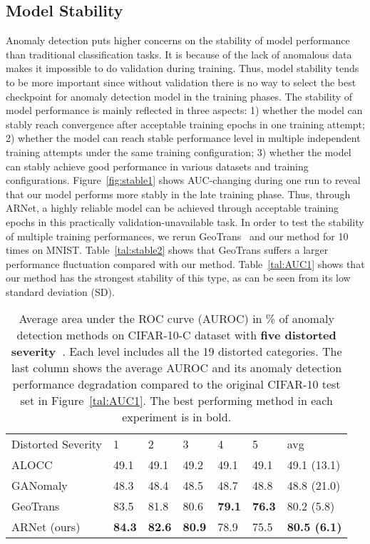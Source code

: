 \documentclass[journal]{IEEEtran}
\begin{document}
\subsection{Model Stability} 
Anomaly detection puts higher concerns on the stability of model performance than traditional classification tasks. It is because of the lack of anomalous data makes it impossible to do validation during training. Thus, model stability tends to be more important since without validation there is no way to select the best checkpoint for anomaly detection model in the training phases. The stability of model performance is mainly reflected in three aspects: 1) whether the model can stably reach convergence after acceptable training epochs in one training attempt; 2) whether the model can reach stable performance level in multiple independent training attempts under the same training configuration; 3) whether the model can stably achieve good performance in various datasets and training configurations. Figure~\ref{fig:stable1} shows AUC-changing during one run to reveal that our model performs more stably in the late training phase. Thus, through ARNet, a highly reliable model can be achieved through acceptable training epochs in this practically validation-unavailable task. In order to test the stability of multiple training performances, we rerun GeoTrans~\cite{golan2018deep} and our method for 10 times on MNIST. Table~\ref{tal:stable2} shows that GeoTrans suffers a larger performance fluctuation compared with our method. Table~\ref{tal:AUC1} shows that our method has the strongest stability of this type, as can be seen from its low standard deviation (SD).

\renewcommand \arraystretch{0.95}
\begin{table}[t]
	\centering
		\caption{Average area under the ROC curve (AUROC) in \% of anomaly detection methods on CIFAR-10-C dataset with \textbf{five distorted severity~\cite{hendrycks2018benchmarking}}. Each level includes all the 19 distorted categories. The last column shows the average AUROC and its anomaly detection performance degradation compared to the original CIFAR-10 test set in Figure~\ref{tal:AUC1}. The best performing method in each experiment is in bold.}
	\footnotesize
	\begin{tabular}{C{2.1cm}C{0.45cm}C{0.45cm}C{0.45cm}C{0.45cm}C{0.45cm}C{1.4cm}}
		\toprule
		 Distorted Severity & 1 & 2 & 3 & 4 & 5 & avg\\
		\cmidrule(lr){1-1} \cmidrule(lr){2-2} \cmidrule(lr){3-3} \cmidrule(lr){4-4} \cmidrule(lr){5-5} \cmidrule(lr){6-6}
		\cmidrule(lr){7-7}
		ALOCC~\cite{Sabokrou2018Adversarially} & 49.1 & 49.1 & 49.2 & 49.1 & 49.1 & 49.1 (13.1)\\
		GANomaly~\cite{Akcay2018} & 48.3 & 48.4 & 48.5 & 48.7 & 48.8 & 48.8 (21.0)\\
		GeoTrans~\cite{golan2018deep} & 83.5 & 81.8 & 80.6 & \textbf{79.1} & \textbf{76.3} & 80.2 (5.8)\\
		ARNet (ours) & \textbf{84.3} & \textbf{82.6} & \textbf{80.9} & 78.9 & 75.5 & \textbf{80.5 (6.1)}\\
		\bottomrule
		\end{tabular}
	\label{tal:cifar10c1}
\end{table}
\end{document}
